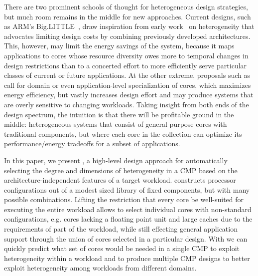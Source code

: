 There are two prominent schools of thought for heterogeneous design
strategies, but much room remains in the middle for new
approaches. Current designs, such as ARM's
Big.LITTLE~\cite{ARM11-WhitePaper-BigLittle}, draw inspiration from
early work~\cite{Kumar03-SIHM,Kumar06-PACT-SIHM,Kumar04-SIHM} on
heterogeneity that advocates limiting design costs by combining
previously developed architectures. This, however, may limit the energy
savings of the system, because it maps applications to cores whose
resource diversity owes more to temporal changes in design
restrictions than to a concerted effort to more efficiently serve
particular classes of current or future applications. At the other
extreme, proposals such
as~\cite{Clark05-ISCA-CustomISA,Clark08-ISCA-VEAL,Goulding11-IEEEMICRO-GreenDroid,Venkatesh10-ASPLOS-CCores}
call for domain or even application-level specialization of cores,
which maximizes energy efficiency, but vastly increases design effort
and may produce systems that are overly sensitive to changing
workloads. Taking insight from both ends of the design spectrum, the
intuition is that there will be profitable ground in the middle:
heterogeneous systems that consist of general purpose cores with
traditional components, but where each core in the collection can
optimize its performance/energy tradeoffs for a subset of
applications.

In this paper, we present \blackBox{}, a high-level design approach
for automatically selecting the degree and dimensions of heterogeneity
in a CMP based on the architecture-independent features of a target
workload. \blackBox{} constructs processor configurations out of a
modest sized library of fixed components, but with many possible
combinations. Lifting the restriction that every core be well-suited
for executing the entire workload allows \blackBox{} to select
individual cores with non-standard configurations, e.g. cores lacking
a floating point unit and large caches due to the requirements of part
of the workload, while still effecting general application support through the union of
cores selected in a particular design. With \blackBox{} we can quickly
predict what set of cores would be needed in a single CMP to exploit
heterogeneity within a workload and to produce multiple CMP designs to
better exploit heterogeneity among workloads from different domains.

